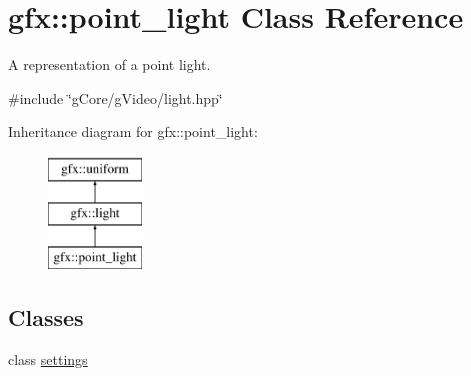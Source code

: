 \hypertarget{classgfx_1_1point__light}{\section{gfx\-:\-:point\-\_\-light Class Reference}
\label{classgfx_1_1point__light}
}


A representation of a point light.  




{\ttfamily \#include \char`\"{}g\-Core/g\-Video/light.\-hpp\char`\"{}}

Inheritance diagram for gfx\-:\-:point\-\_\-light\-:\begin{figure}[H]
\begin{center}
\leavevmode
\includegraphics[height=3.000000cm]{classgfx_1_1point__light}
\end{center}
\end{figure}
\subsection*{Classes}
\begin{DoxyCompactItemize}
\item 
class \hyperlink{classgfx_1_1point__light_1_1settings}{settings}
\end{DoxyCompactItemize}
